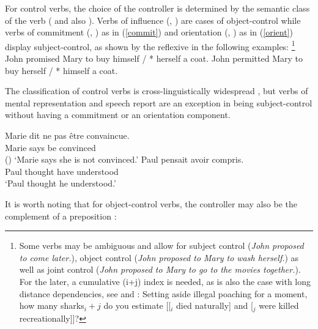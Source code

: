 For control verbs, the choice of the controller is determined by the semantic class of the verb
(\citealt[Chapter~3]{PollardandSag1994} and also \citealt{JackendoffandCulicover2003}).  Verbs of
influence (, ) are cases of object-control while verbs of commitment
(, ) as in (\ref{commit}) and orientation (, ) as in
(\ref{orient}) display subject-control, as shown by the reflexive in the following examples:%
\footnote{Some verbs may be ambiguous and allow for subject control (\emph{John proposed to come
    later.}), object control (\emph{John proposed to Mary to wash herself.}) as well as joint
  control (\emph{John proposed to Mary to go to the movies together.}). For the later, a cumulative
  (i+j) index is needed, as is also the case with long distance dependencies, see
   and \crossrefchapterw[\pageref{ex:UDC:31}]{udc}:
\ea
Setting aside illegal poaching for a moment, how many sharks$_i+j$ do you estimate [[$_i$ died
naturally] and [$_j$ were killed recreationally]]?
\zlast
}
\eal
\ex\label{ex-John-promised-Mary-to-buy}
John promised Mary to buy himself / * herself a coat. \label{commit}
\ex\label{ex-John-permitted-Mary-to-buy} 
John permitted Mary to buy herself / * himself a coat.\label{orient}
\zl
 
  The classification of control verbs is cross-linguistically widespread \citep{VanValinandLapolla1997}, but  verbs of mental representation and speech report are an exception in being subject-control without having a commitment or an orientation component.


\begin{exe}
\ex \begin{xlist}
\ex 
\gll Marie dit {ne pas} \^etre convaincue.\\
     Marie says  be convinced \\\hfill()
\glt `Marie says she is not convinced.'	
\ex 
\gll Paul pensait  avoir compris. \\
     Paul thought have understood \\
\glt `Paul thought he understood.'
 \end{xlist}
\end{exe}

It is worth noting that for object-control verbs, the controller may also be the complement of a preposition \citep[]{PollardandSag1994}:

